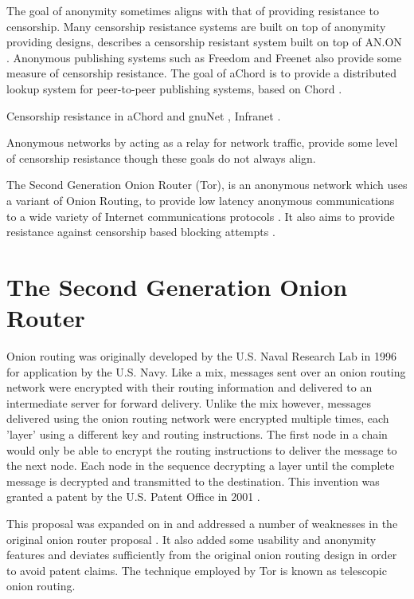 \documentclass{ecuthesis}
\begin{document}
The goal of anonymity sometimes aligns with that of providing resistance to
censorship. Many censorship resistance systems are built on top of anonymity
providing designs, \textcite{Kopsell:2004:ABR:1029179.1029197} describes a
censorship resistant system built on top of AN.ON
\parencite{springerlink:10.1007/3-540-44702-4_7}.  Anonymous publishing systems
such as Freedom \parencite{Goldberg:1999p2231} and Freenet
\parencite{Clarke:2001p2435} also provide some measure of censorship resistance.
The goal of aChord \parencite{Hazel:2002p6929} is to provide a distributed
lookup system for peer-to-peer publishing systems, based on Chord
\parencite{Stoica:2001:CSP:383059.383071}.

Censorship resistance in aChord and gnuNet
\parencite{Hazel:2002p6929}, Infranet \parencite{Feamster:2002p307}.

Anonymous networks by acting as a relay for network traffic, provide some level
of censorship resistance though these goals do not always align.

The Second Generation Onion Router (Tor), is an anonymous network which uses a
variant of Onion Routing, to provide low latency anonymous communications to a
wide variety of Internet communications protocols
\parencite{Dingledine:2004p314}. It also aims to provide resistance against
censorship based blocking attempts \parencite{Dingledine:2008p1542}.

\section{The Second Generation Onion Router}

Onion routing was originally developed by the U.S. Naval Research Lab in 1996
\parencite{Goldschlag:1996wy} for application by the U.S. Navy. Like a mix,
messages sent over an onion routing network were encrypted with their routing
information and delivered to an intermediate server for forward delivery.
Unlike the mix however, messages delivered using the onion routing network were
encrypted multiple times, each 'layer' using a different key and routing
instructions. The first node in a chain would only be able to encrypt the
routing instructions to deliver the message to the next node. Each node in the
sequence decrypting a layer until the complete message is decrypted and
transmitted to the destination. This invention was granted a patent by the U.S.
Patent Office in 2001 \parencite{Michael:2001}.

This proposal was expanded on in  and addressed a
number of weaknesses in the original onion router proposal
\parencite{Dingledine:2004p314}. It also added some usability and anonymity
features and deviates sufficiently from the original onion routing design in
order to avoid patent claims. The technique employed by Tor is known as
telescopic onion routing.
\end{document}
